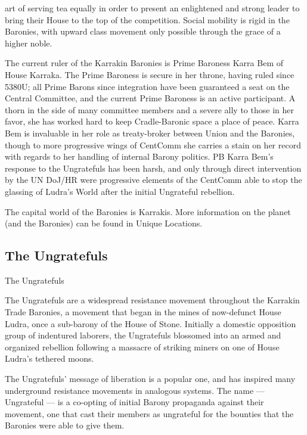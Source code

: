                                                                                                                     


art of serving tea equally in order to present an enlightened and strong leader to bring their  
House to the top of the competition. Social mobility is rigid in the Baronies, with upward class  
movement only possible through the grace of a higher noble. 
 

The current ruler of the Karrakin Baronies is Prime Baroness Karra Bem of House Karraka. The  
Prime Baroness is secure in her throne, having ruled since 5380U; all Prime Barons since  
integration have been guaranteed a seat on the Central Committee, and the current Prime  
Baroness is an active participant. A thorn in the side of many committee members and a severe  
ally to those in her favor, she has worked hard to keep Cradle-Baronic space a place of peace.  
Karra Bem is invaluable in her role as treaty-broker between Union and the Baronies, though to  
more progressive wings of CentComm she carries a stain on her record with regards to her  
handling of internal Barony politics. PB Karra Bem’s response to the Ungratefuls has been harsh,  
and only through direct intervention by the UN DoJ/HR were progressive elements of the  
CentComm able to stop the glassing of Ludra’s World after the initial Ungrateful rebellion. 
 

The capital world of the Baronies is Karrakis. More information on the planet (and the Baronies)  
can be found in Unique Locations. 
 
\subsection{The Ungratefuls}
The Ungratefuls   

The Ungratefuls are a widespread resistance movement throughout the Karrakin Trade Baronies,  
a movement that began in the mines of now-defunct House Ludra, once a sub-barony of the  
House of Stone. Initially a domestic opposition group of indentured laborers, the Ungratefuls  
blossomed into an armed and organized rebellion following a massacre of striking miners on one  
of House Ludra’s tethered moons. 
 

The Ungratefuls’ message of liberation is a popular one, and has inspired many underground  
resistance movements in analogous systems. The name — Ungrateful — is a co-opting of initial  
Barony propaganda against their movement, one that cast their members as ungrateful for the  
bounties that the Baronies were able to give them. 
 


